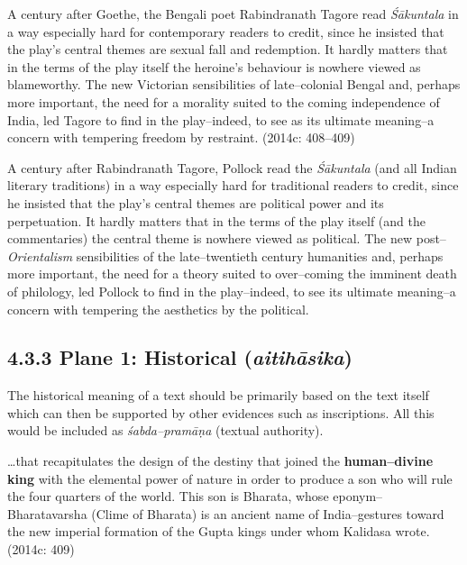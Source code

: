 \begin{myquote}
A century after Goethe, the Bengali poet Rabindranath Tagore read \textit{Śākuntala} in a way especially hard for contemporary readers to credit, since he insisted that the play’s central themes are sexual fall and redemption. It hardly matters that in the terms of the play itself the heroine’s behaviour is nowhere viewed as blameworthy. The new Victorian sensibilities of late–colonial Bengal and, perhaps more important, the need for a morality suited to the coming independence of India, led Tagore to find in the play–indeed, to see as its ultimate meaning–a concern with tempering freedom by restraint. (2014c: 408–409)
\end{myquote}

A century after Rabindranath Tagore, Pollock read the \textit{Śākuntala} (and all Indian literary traditions) in a way especially hard for traditional readers to credit, since he insisted that the play’s central themes are political power and its perpetuation. It hardly matters that in the terms of the play itself (and the commentaries) the central theme is nowhere viewed as political. The new post–\textit{Orientalism} sensibilities of the late–twentieth century humanities and, perhaps more important, the need for a theory suited to over–coming the imminent death of philology, led Pollock to find in the play–indeed, to see its ultimate meaning–a concern with tempering the aesthetics by the political.

\newpage

\subsection*{4.3.3 Plane 1: Historical ({\it {\bfseries aitihāsika}})}

The historical meaning of a text should be primarily based on the text itself which can then be supported by other evidences such as inscriptions. All this would be included as \textit{śabda–pramāṇa} (textual authority).

\begin{myquote}
…that recapitulates the design of the destiny that joined the \textbf{human–divine king} with the elemental power of nature in order to produce a son who will rule the four quarters of the world. This son is Bharata, whose eponym–Bharatavarsha (Clime of Bharata) is an ancient name of India–gestures toward the new imperial formation of the Gupta kings under whom Kalidasa wrote. (2014c: 409)
\end{myquote}

